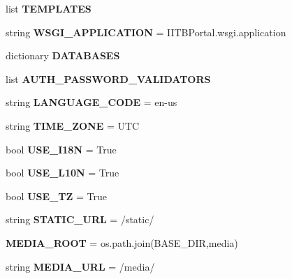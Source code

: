 \begin{DoxyCompactItemize}
list {\bfseries T\+E\+M\+P\+L\+A\+T\+ES}
\item 
\mbox{\label{namespaceIITBPortal_1_1settings_a5829a178c77c277b9586340363a2a7d1}} 
string {\bfseries W\+S\+G\+I\+\_\+\+A\+P\+P\+L\+I\+C\+A\+T\+I\+ON} = \textquotesingle{}I\+I\+T\+B\+Portal.\+wsgi.\+application\textquotesingle{}
\item 
dictionary {\bfseries D\+A\+T\+A\+B\+A\+S\+ES}
\item 
list {\bfseries A\+U\+T\+H\+\_\+\+P\+A\+S\+S\+W\+O\+R\+D\+\_\+\+V\+A\+L\+I\+D\+A\+T\+O\+RS}
\item 
\mbox{\label{namespaceIITBPortal_1_1settings_aa13d3ef4ca5a54b951709337e8e1a9a4}} 
string {\bfseries L\+A\+N\+G\+U\+A\+G\+E\+\_\+\+C\+O\+DE} = \textquotesingle{}en-\/us\textquotesingle{}
\item 
\mbox{\label{namespaceIITBPortal_1_1settings_ae82fcfcd0a40bbb8e7c7f12a004e11a0}} 
string {\bfseries T\+I\+M\+E\+\_\+\+Z\+O\+NE} = \textquotesingle{}U\+TC\textquotesingle{}
\item 
\mbox{\label{namespaceIITBPortal_1_1settings_ac3196a3a9e229dc763a342ff830bb010}} 
bool {\bfseries U\+S\+E\+\_\+\+I18N} = True
\item 
\mbox{\label{namespaceIITBPortal_1_1settings_a4afe55cd9d36bb01c62251d2a675cf86}} 
bool {\bfseries U\+S\+E\+\_\+\+L10N} = True
\item 
\mbox{\label{namespaceIITBPortal_1_1settings_a7cd1e6a1bb3bb85753352467985cb93e}} 
bool {\bfseries U\+S\+E\+\_\+\+TZ} = True
\item 
\mbox{\label{namespaceIITBPortal_1_1settings_a9e14a6b85c32722176c55af19eecf4f2}} 
string {\bfseries S\+T\+A\+T\+I\+C\+\_\+\+U\+RL} = \textquotesingle{}/static/\textquotesingle{}
\item 
\mbox{\label{namespaceIITBPortal_1_1settings_a434371b2680878b795288921788dd08a}} 
{\bfseries M\+E\+D\+I\+A\+\_\+\+R\+O\+OT} = os.\+path.\+join(B\+A\+S\+E\+\_\+\+D\+IR,\textquotesingle{}media\textquotesingle{})
\item 
\mbox{\label{namespaceIITBPortal_1_1settings_a49b0be103537c65de061db7fe3192e45}} 
string {\bfseries M\+E\+D\+I\+A\+\_\+\+U\+RL} = \textquotesingle{}/media/\textquotesingle{}
\end{DoxyCompactItemize}


